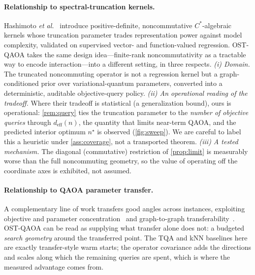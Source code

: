 \documentclass[aps,prresearch,reprint,amsmath,amssymb,floatfix,nofootinbib,superscriptaddress,longbibliography]{revtex4-2}
\theoremstyle{remark}
\newcommand{\OSTQAOA}{\textnormal{\textsc{OST-QAOA}}}
\newcommand{\TQA}{\textnormal{\textsc{TQA}}}
\begin{document}
\paragraph{Relationship to spectral-truncation kernels.}
Hashimoto \emph{et al.}~\cite{hashimoto2024spectral} introduce positive-definite,
noncommutative \(C^*\)-algebraic kernels whose truncation parameter trades
representation power against model complexity, validated on supervised vector-
and function-valued regression.  \OSTQAOA{} takes the same design idea---finite-rank
noncommutativity as a tractable way to encode interaction---into a different
setting, in three respects.  \emph{(i) Domain.}  The truncated noncommuting
operator is not a regression kernel but a graph-conditioned prior over
variational-quantum parameters, converted into a deterministic, auditable
objective-query policy.  \emph{(ii) An operational reading of the tradeoff.}
Where their tradeoff is statistical (a generalization bound), ours is operational:
\cref{rem:query} ties the truncation parameter to the \emph{number of objective
queries} through \(d_{\mathrm{eff}}(n)\), the quantity that limits near-term QAOA,
and the predicted interior optimum \(n^{\star}\) is observed (\cref{fig:sweep}).
We are careful to label this a heuristic under \cref{ass:coverage}, not a
transported theorem.  \emph{(iii) A tested mechanism.}  The diagonal (commutative)
restriction of \cref{prop:limit} is measurably worse than the full noncommuting
geometry, so the value of operating off the coordinate axes is exhibited, not
assumed.

\paragraph{Relationship to QAOA parameter transfer.}
A complementary line of work transfers good angles across instances, exploiting
objective and parameter concentration~\cite{brandao2018,akshay2021} and
graph-to-graph transferability~\cite{galda2021,shaydulin2023transfer}.
\OSTQAOA{} can be read as supplying what transfer alone does not: a budgeted
\emph{search geometry} around the transferred point.  The \TQA{} and kNN
baselines here are exactly transfer-style warm starts; the operator covariance
adds the directions and scales along which the remaining queries are spent, which
is where the measured advantage comes from.
\end{document}
